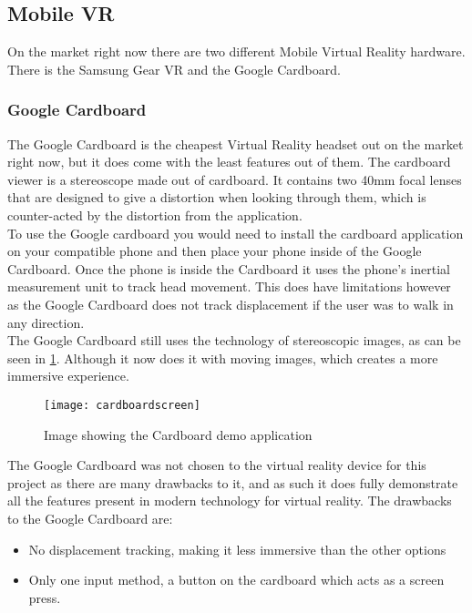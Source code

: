 \subsection{Mobile VR}
On the market right now there are two different Mobile Virtual Reality hardware. There is the Samsung Gear VR and the Google Cardboard.

\subsubsection{Google Cardboard}
The Google Cardboard is the cheapest Virtual Reality headset out on the market right now, but it does come with the least features out of them. The cardboard viewer is a stereoscope made out of cardboard. It contains two 40mm focal lenses that are designed to give a distortion when looking through them, which is counter-acted by the distortion from the application\cite{cardboarddev}.\\
	To use the Google cardboard you would need to install the cardboard application on your compatible phone and then place your phone inside of the Google Cardboard. Once the phone is inside the Cardboard it uses the phone's inertial measurement unit to track head movement. This does have limitations however as the Google Cardboard does not track displacement if the user was to walk in any direction. \\
	The Google Cardboard still uses the technology of stereoscopic images, as can be seen in \ref{fig:cardboard1}. Although it now does it with moving images, which creates a more immersive experience. \\

\begin{figure}[H]
	\texttt{[image: cardboardscreen]}
	\centering
	\caption{Image showing the Cardboard demo application}
	\label{fig:cardboard1}
\end{figure}

	The Google Cardboard was not chosen to the virtual reality device for this project as there are many drawbacks to it, and as such it does fully demonstrate all the features present in modern technology for virtual reality. The drawbacks to the Google Cardboard are:

\begin{itemize}
	\item No displacement tracking, making it less immersive than the other options
	\item Only one input method, a button on the cardboard which acts as a screen press.
\end{itemize}


